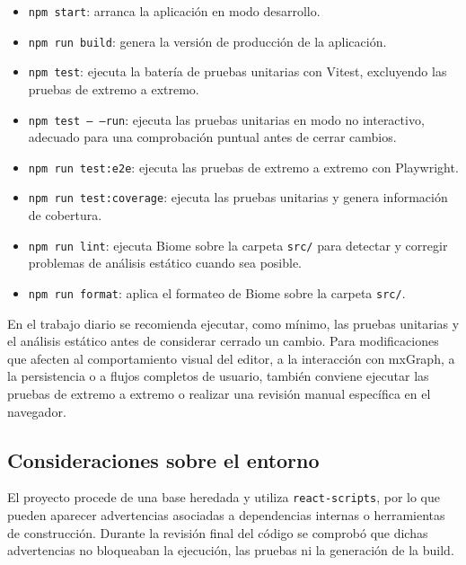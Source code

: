 \begin{itemize}
\item \texttt{npm start}: arranca la aplicación en modo desarrollo.

\item \texttt{npm run build}: genera la versión de producción de la aplicación.

\item \texttt{npm test}: ejecuta la batería de pruebas unitarias con Vitest, excluyendo las pruebas de extremo a extremo.

\item \texttt{npm test -- --run}: ejecuta las pruebas unitarias en modo no interactivo, adecuado para una comprobación puntual antes de cerrar cambios.

\item \texttt{npm run test:e2e}: ejecuta las pruebas de extremo a extremo con Playwright.

\item \texttt{npm run test:coverage}: ejecuta las pruebas unitarias y genera información de cobertura.

\item \texttt{npm run lint}: ejecuta Biome sobre la carpeta \texttt{src/} para detectar y corregir problemas de análisis estático cuando sea posible.

\item \texttt{npm run format}: aplica el formateo de Biome sobre la carpeta \texttt{src/}.

\end{itemize}

En el trabajo diario se recomienda ejecutar, como mínimo, las pruebas unitarias y el análisis estático antes de considerar cerrado un cambio. Para modificaciones que afecten al comportamiento visual del editor, a la interacción con mxGraph, a la persistencia o a flujos completos de usuario, también conviene ejecutar las pruebas de extremo a extremo o realizar una revisión manual específica en el navegador.

\subsection{Consideraciones sobre el entorno}

El proyecto procede de una base heredada y utiliza \texttt{react-scripts}, por lo que pueden aparecer advertencias asociadas a dependencias internas o herramientas de construcción. Durante la revisión final del código se comprobó que dichas advertencias no bloqueaban la ejecución, las pruebas ni la generación de la build.

